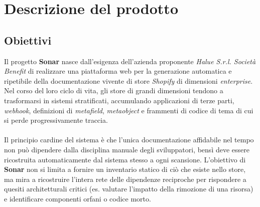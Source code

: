 \section{Descrizione del prodotto}

\subsection{Obiettivi}
Il progetto \textbf{Sonar} nasce dall'esigenza dell'azienda proponente \textit{Halue S.r.l. Società Benefit} di realizzare una piattaforma web per la generazione automatica e ripetibile della documentazione vivente di store \textit{Shopify} di dimensioni \textit{enterprise}. \\
Nel corso del loro ciclo di vita, gli store di grandi dimensioni tendono a trasformarsi in sistemi stratificati, accumulando applicazioni di terze parti, \textit{webhook}, definizioni di \textit{metafield}, \textit{metaobject} e frammenti di codice di tema di cui si perde progressivamente traccia. \\
\\
Il principio cardine del sistema è che l'unica documentazione affidabile nel tempo non può dipendere dalla disciplina manuale degli sviluppatori, bensì deve essere ricostruita automaticamente dal sistema stesso a ogni scansione. L'obiettivo di \textbf{Sonar} non si limita a fornire un inventario statico di ciò che esiste nello store, ma mira a ricostruire l'intera rete delle dipendenze reciproche per rispondere a quesiti architetturali critici (es. valutare l'impatto della rimozione di una risorsa) e identificare componenti orfani o codice morto.

